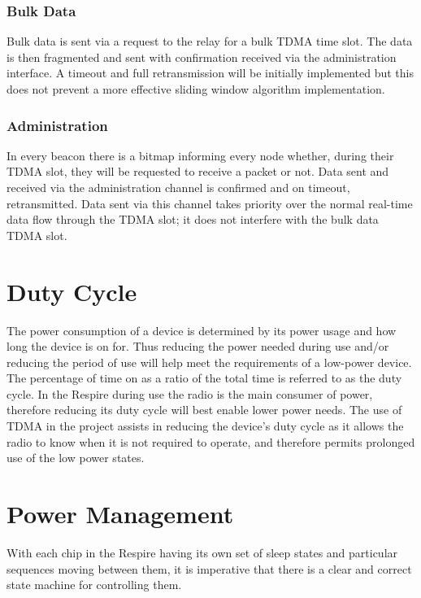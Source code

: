 \subsubsection{Bulk Data}
Bulk data is sent via a request to the relay for a bulk \ac{TDMA} time slot. The data is then fragmented
and sent with confirmation received via the administration interface. A timeout and full
retransmission will be initially implemented but this does not prevent a more effective sliding
window algorithm implementation.

\subsubsection{Administration}
In every beacon there is a bitmap informing every node whether, during their \ac{TDMA} slot, they will
be requested to receive a packet or not. Data sent and received via the administration channel is
confirmed and on timeout, retransmitted. Data sent via this channel takes priority over the normal
real-time data flow through the \ac{TDMA} slot; it does not interfere with the bulk data \ac{TDMA} slot.


\section{Duty Cycle}
The power consumption of a device is determined by its power usage and how long the device is on
for. Thus reducing the power needed during use and/or reducing the period of use will help meet
the requirements of a low-power device. The percentage of time on as a ratio of the total time is
referred to as the duty cycle. In the Respire during use the radio is the main consumer of power,
therefore reducing its duty cycle will best enable lower power needs. The use of \ac{TDMA} in the project
assists in reducing the device’s duty cycle as it allows the radio to know when it is not required to
operate, and therefore permits prolonged use of the low power states.


\section{Power Management}
With each chip in the Respire having its own set of sleep states and particular sequences moving
between them, it is imperative that there is a clear and correct state machine for controlling them.



